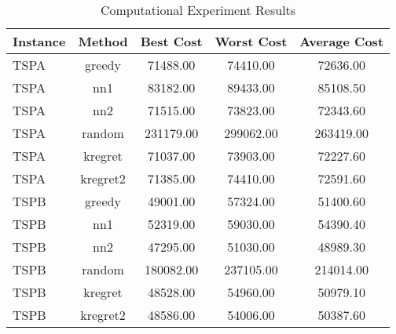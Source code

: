 \begin{table}[ht]
\centering
\caption{Computational Experiment Results}
\label{tab:results}
\begin{tabular}{lcccc}
\hline
Instance & Method & Best Cost & Worst Cost & Average Cost \\
\hline
TSPA & greedy & 71488.00 & 74410.00 & 72636.00 \\
TSPA & nn1 & 83182.00 & 89433.00 & 85108.50 \\
TSPA & nn2 & 71515.00 & 73823.00 & 72343.60 \\
TSPA & random & 231179.00 & 299062.00 & 263419.00 \\
TSPA & kregret & 71037.00 & 73903.00 & 72227.60 \\
TSPA & kregret2 & 71385.00 & 74410.00 & 72591.60 \\
TSPB & greedy & 49001.00 & 57324.00 & 51400.60 \\
TSPB & nn1 & 52319.00 & 59030.00 & 54390.40 \\
TSPB & nn2 & 47295.00 & 51030.00 & 48989.30 \\
TSPB & random & 180082.00 & 237105.00 & 214014.00 \\
TSPB & kregret & 48528.00 & 54960.00 & 50979.10 \\
TSPB & kregret2 & 48586.00 & 54006.00 & 50387.60 \\
\hline
\end{tabular}
\end{table}
